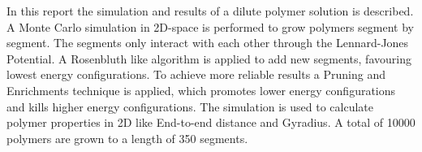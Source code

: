 In this report the simulation and results of a dilute polymer solution is described.  A Monte Carlo simulation in 2D-space is performed to grow polymers segment by segment. The segments only interact with each other through the Lennard-Jones Potential. A Rosenbluth like algorithm is applied to add new segments, favouring lowest energy configurations. To achieve more reliable results a Pruning and Enrichments technique is applied, which promotes lower energy configurations and kills higher energy configurations. The simulation is used to calculate polymer properties in 2D like End-to-end distance and Gyradius. A total of 10000 polymers are grown to a length of 350 segments.